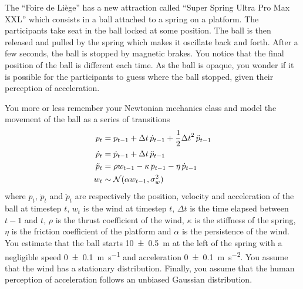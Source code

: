 \documentclass[11pt, a4paper]{article}
\begin{document}
The \enquote{Foire de Liège} has a new attraction called \enquote{Super Spring Ultra Pro Max XXL} which consists in a ball attached to a spring on a platform. The participants take seat in the ball locked at some position. The ball is then released and pulled by the spring which makes it oscillate back and forth. After a few seconds, the ball is stopped by magnetic brakes. You notice that the final position of the ball is different each time. As the ball is opaque, you wonder if it is possible for the participants to guess where the ball stopped, given their perception of acceleration.

You more or less remember your Newtonian mechanics class and model the movement of the ball as a series of transitions
\begin{align*}
    p_t & = p_{t-1} + \Delta t \, \dot{p}_{t-1} + \frac{1}{2} {\Delta t}^2 \, \ddot{p}_{t-1} \\
    \dot{p}_t & = \dot{p}_{t-1} + \Delta t \, \ddot{p}_{t-1} \\
    \ddot{p}_t & = \rho w_{t-1} - \kappa \, p_{t-1} - \eta \, \dot{p}_{t-1} \\
    w_t & \sim \mathcal{N}(\alpha w_{t-1}, \sigma_w^2)
\end{align*}
where $p_t$, $\dot{p}_t$ and $\ddot{p}_t$ are respectively the position, velocity and acceleration of the ball at timestep $t$, $w_t$ is the wind at timestep $t$, $\Delta t$ is the time elapsed between $t-1$ and $t$, $\rho$ is the thrust coefficient of the wind, $\kappa$ is the stiffness of the spring, $\eta$ is the friction coefficient of the platform and $\alpha$ is the persistence of the wind. You estimate that the ball starts \qty{10 \pm 0.5}{\meter} at the left of the spring with a negligible speed \qty{0 \pm 0.1}{\meter\per\second} and acceleration \qty{0 \pm 0.1}{\meter\per\second\squared}. You assume that the wind has a stationary distribution. Finally, you assume that the human perception of acceleration follows an unbiased Gaussian distribution.
\end{document}
